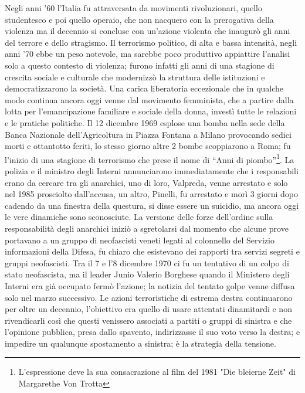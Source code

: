 Negli anni '60 l'Italia fu attraversata da movimenti rivoluzionari, quello studentesco e poi quello operaio, che non nacquero con la prerogativa della violenza ma il decennio si concluse con un'azione violenta che inaugurò gli anni del terrore e dello stragismo.
Il terrorismo politico, di alta e bassa intensità, negli anni '70 ebbe un peso notevole, ma sarebbe poco produttivo appiattire l'analisi solo a questo contesto di violenza; furono infatti gli anni di una stagione di crescita sociale e culturale che modernizzò la struttura delle istituzioni e democratizzarono la società.
Una carica liberatoria eccezionale che in qualche modo continua ancora oggi venne dal movimento femminista, che a partire dalla lotta per l'emancipazione familiare e sociale della donna, investì tutte le relazioni e le pratiche politiche.
Il 12 dicembre 1969 esplose una bomba nella sede della Banca Nazionale dell'Agricoltura in Piazza Fontana a Milano provocando sedici morti e ottantotto feriti, lo stesso giorno altre 2 bombe scoppiarono a Roma; fu l'inizio di una stagione di terrorismo che prese il nome di \enquote{Anni di piombo}\footnote{L'espressione deve la sua consacrazione al film del 1981 "Die bleierne Zeit" di Margarethe Von Trotta}.
La polizia e il ministro degli Interni annunciarono immediatamente che i responsabili erano da cercare tra gli anarchici, uno di loro, Valpreda, venne arrestato e solo nel 1985 prosciolto dall'accusa, un altro, Pinelli, fu arrestato e morì 3 giorni dopo cadendo da una finestra della questura, si disse essere un suicidio, ma ancora oggi le vere dinamiche sono sconosciute.
La versione delle forze dell'ordine sulla responsabilità degli anarchici iniziò a sgretolarsi dal momento che alcune prove portavano a un gruppo di neofascisti veneti legati al colonnello del Servizio informazioni della Difesa, fu chiaro che esistevano dei rapporti tra servizi segreti e gruppi neofascisti.
Tra il 7 e l'8 dicembre 1970 ci fu un tentativo di un colpo di stato neofascista, ma il leader Junio Valerio Borghese quando il Ministero degli Interni era già occupato fermò l'azione; la notizia del tentato golpe venne diffusa solo nel marzo successivo.
Le azioni terroristiche di estrema destra continuarono per oltre un decennio, l'obiettivo era quello di usare attentati dinamitardi e non rivendicarli così che questi venissero associati a partiti o gruppi di sinistra e che l'opinione pubblica, presa dallo spavento, indirizzasse il suo voto verso la destra; e impedire un qualunque spostamento a sinistra; è la strategia della tensione.
